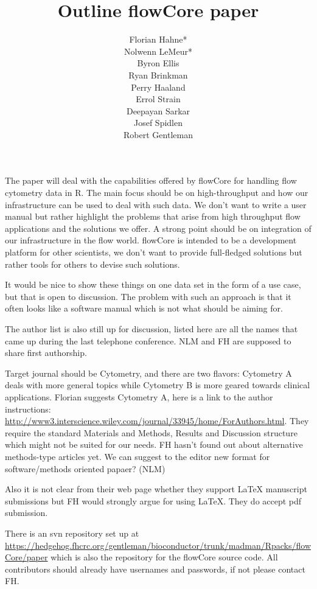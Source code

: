 \documentclass[12pt]{article}
\title{Outline flowCore paper}
\author{Florian Hahne*\\
  Nolwenn LeMeur*\\
  Byron Ellis\\
  Ryan Brinkman\\
  Perry Haaland\\
  Errol Strain\\
  Deepayan Sarkar\\
  Josef Spidlen\\
  Robert Gentleman
 }
\begin{document}
\maketitle

\vspace{2ex} The paper will deal with the capabilities offered by
flowCore for handling flow cytometry data in R. The main focus should
be on high-throughput and how our infrastructure can be used to deal
with such data. We don't want to write a user manual but rather
highlight the problems that arise from high throughput flow
applications and the solutions we offer. A strong point should be on
integration of our infrastructure in the flow world. flowCore is
intended to be a development platform for other scientists, we don't
want to provide full-fledged solutions but rather tools for others to
devise such solutions.


It would be nice to show these things on one data set in the form of a
use case, but that is open to discussion. The problem with such an
approach is that it often looks like a software manual which is not
what should be aiming for. 

The author list is also still up for discussion, listed here are all
the names that came up during the last telephone conference. NLM and
FH are supposed to share first authorship.

Target journal should be Cytometry, and there are two flavors:
Cytometry A deals with more general topics while Cytometry B is more
geared towards clinical applications. Florian suggests Cytometry A,
here is a link to the author instructions:
\url{http://www3.interscience.wiley.com/journal/33945/home/ForAuthors.html}.
They require the standard Materials and Methods, Results and
Discussion structure which might not be suited for our needs. FH
hasn't found out about alternative methods-type articles yet.  We can
suggest to the editor new format for software/methods oriented papaer?
(NLM)

Also it is not clear from their web page whether they support LaTeX
manuscript submissions but FH would strongly argue for using
LaTeX. They do accept pdf submission.

There is an svn repository set up at
\url{https://hedgehog.fhcrc.org/gentleman/bioconductor/trunk/madman/Rpacks/flowCore/paper}
which is also the repository for the flowCore source code. All
contributors should already have usernames and passwords, if not
please contact FH.
\end{document}
